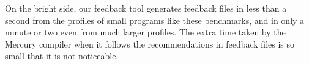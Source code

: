 On the bright side,
our feedback tool generates feedback files
in less than a second from the profiles of small programs like these benchmarks,
and in only a minute or two even from much larger profiles.
The extra time taken by the Mercury compiler
when it follows the recommendations in feedback files
is so small that it is not noticeable.




